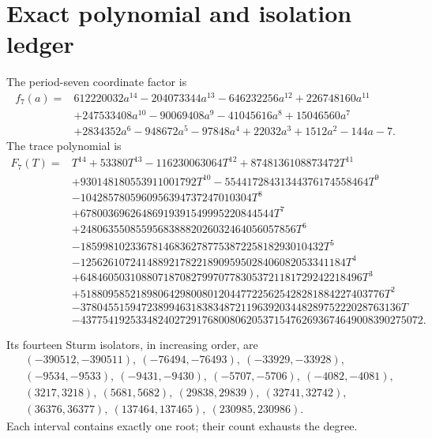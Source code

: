 \appendix
\section{Exact polynomial and isolation ledger}\label{sec:ledger}

The period-seven coordinate factor is
\begin{align*}
f_7(a)={}&612220032a^{14}-204073344a^{13}-646232256a^{12}
+226748160a^{11}\\
&+247533408a^{10}-90069408a^9-41045616a^8+15046560a^7\\
&+2834352a^6-948672a^5-97848a^4+22032a^3+1512a^2-144a-7.
\end{align*}
The trace polynomial is
\begin{align*}
F_7(T)={}&T^{14}+53380T^{13}-116230063064T^{12}
+8748136108873472T^{11}\\
&+930148180553911001792T^{10}
-55441728431344376174558464T^9\\
&-1042857805960956394737247010304T^8\\
&+67800369626486919391549995220844544T^7\\
&+248063550855956838882026032464056057856T^6\\
&-18599810233678146836278775387225818293010432T^5\\
&-125626107241488921782218909595028406082053341184T^4\\
&+648460503108807187082799707783053721181729242218496T^3\\
&+5188095852189806429800801204477225625428281884227403776T^2\\
&-3780455159472389946318383487211963920344828975222028763136T\\
&-43775419253348240272917680080620537154762693674649008390275072.
\end{align*}

Its fourteen Sturm isolators, in increasing order, are
\begin{align*}
&(-390512,-390511),\ (-76494,-76493),\ (-33929,-33928),\\
&(-9534,-9533),\ (-9431,-9430),\ (-5707,-5706),\ (-4082,-4081),\\
&(3217,3218),\ (5681,5682),\ (29838,29839),\ (32741,32742),\\
&(36376,36377),\ (137464,137465),\ (230985,230986).
\end{align*}
Each interval contains exactly one root; their count exhausts the degree.

